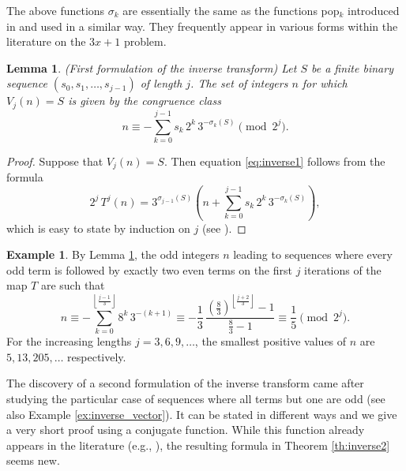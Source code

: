 \documentclass[12pt]{article}
\newtheorem{lemma}{Lemma}
\theoremstyle{definition}
\newtheorem{example}{Example}
\begin{document}
\vspace{10pt}

The above functions $\sigma_k$ are essentially the same as the functions pop$_k$ introduced in \cite{Ber96} and used in a similar way. They frequently appear in various forms within the literature on the $3x+1$ problem.

\begin{lemma}{\em (First formulation of the inverse transform)} \label{lem:inverse1}
Let $S$ be a finite binary sequence $\left( s_0, s_1, \ldots, s_{j-1} \right)$ of length $j$. The set of integers $n$ for which $V_{j}(n) = S$ is given by the congruence class
\begin{equation} \label{eq:inverse1}
n \equiv - \sum_{k=0}^{j-1} s_{k} \, 2^{k} \, 3^{-\sigma_{k}(S)} \pmod{ 2^{j}}.
\end{equation}
\end{lemma}

\begin{proof}
Suppose that $V_{j}(n) = S$. Then equation \eqref{eq:inverse1} follows from the formula
$$ 2^{j} \, T^{j}(n) = 3^{\sigma_{j-1}(S)} \left( n + \sum_{k=0}^{j-1} s_{k} \, 2^{k} \, 3^{-\sigma_{k}(S)} \right),$$
which is easy to state by induction on $j$ (see \cite{Ter76}).
\end{proof}

\begin{example}
By Lemma \ref{lem:inverse1}, the odd integers $n$ leading to sequences where every odd term is followed by exactly two even terms on the first $j$ iterations of the map $T$ are such that
$$n \equiv - \sum_{k=0}^{\left\lfloor\frac{j-1}{3}\right\rfloor} 8^{k} \, 3^{-(k+1)} \equiv - \frac{1}{3} \, \frac{\left( \frac{8}{3} \right)^{\left\lfloor\frac{j+2}{3}\right\rfloor} - 1}{\frac{8}{3} - 1} \equiv \frac{1}{5} \pmod{ 2^{j}}.$$
For the increasing lengths $j=3,6,9,\ldots$, the smallest positive values of $n$ are $5,13,205,\ldots$ respectively.
\end{example}

The discovery of a second formulation of the inverse transform came after studying the particular case of sequences where all terms but one are odd \cite{Roz17} (see also Example \ref{ex:inverse_vector}). It can be stated in different ways and we give a very short proof using a conjugate function. While this function already appears in the literature (e.g., \cite[p. 26]{Sim16}), the resulting formula in Theorem \ref{th:inverse2} seems new.
\end{document}

